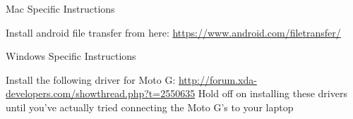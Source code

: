\documentclass[11pt,fleqn]{article}
\begin{document}
\begin{center}
Mac Specific Instructions
\end{center}

Install android file transfer from here: \newline
\url{https://www.android.com/filetransfer/}

\begin{center}
Windows Specific Instructions
\end{center}

Install the following driver for Moto G: \newline
\url{http://forum.xda-developers.com/showthread.php?t=2550635}\newline
Hold off on installing these drivers until you've actually tried connecting the Moto G's to your
laptop
\end{document}
